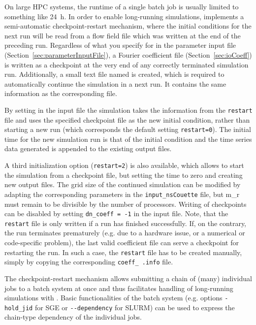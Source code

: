 \documentclass[a4paper, 11pt, DIV=11]{scrartcl}
\begin{document}
On large HPC systems, the runtime of a single batch job is usually limited to something like
\SI{24}{\hour}. In order to enable long-running simulations, \nsc implements a semi-automatic
checkpoint-restart mechanism, where the initial conditions for the next run will be read from
a flow field file which was written at the end of the preceding run. Regardless of what you specify
for  in the parameter input file (Section~\ref{sec:parameterInputFile}), a
Fourier coefficient file (Section~\ref{sec:ioCoeff}) is written as a checkpoint at the very
end of any correctly terminated simulation run. Additionally, a small text file named  is created, which is required to automatically continue the simulation in a next run. It contains the same information as the corresponding  file.
\par
By setting  in the input file 
the simulation takes the information from the \verb+restart+ file and
uses the specified checkpoint file as the new initial condition,
rather than starting a new run (which corresponds the default setting \verb+restart=0+). 
The initial time for the new simulation run is that of the initial
condition and the time series data generated is appended to the existing
output files.
\par
A third initialization  option (\verb+restart=2+)
is also available, which allows to start the simulation
from a checkpoint file, but setting the time to zero and
creating new output files. The grid size of the continued simulation
can be modified by adapting the corresponding parameters in
the \verb+input_nsCouette+ file, but m\_r
must remain to be divisible by the number of processors. Writing of
checkpoints can be disabled by setting \verb+dn_coeff = -1+ in the input file.
%
Note, that the \verb+restart+ file is only written if a run has
finished successfully. If, on the contrary, the run terminates prematurely (e.g.
due to a hardware issue, or a numerical or code-specific problem),  
the last valid coefficient file can serve a checkpoint for restarting
the run. In such a case, the \verb+restart+ file has to be created
manually, simply by copying the corresponding \verb+coeff_ .info+
file. 

The checkpoint-restart mechanism allows submitting a chain of (many)
individual jobs to a batch system at once and thus facilitates handling of long-running
simulations with \nsc. Basic functionalities of the batch system (e.g.
options \verb+-hold_jid+ for SGE or \verb+--dependency+ for SLURM) can be 
used to express the chain-type dependency of the individual jobs.
\end{document}
